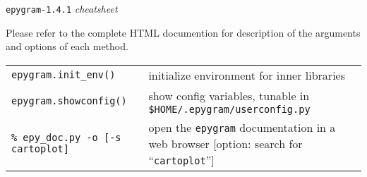 \documentclass[a4paper,10pt]{article}
\date{\vspace{-1.5cm}}
\begin{document}
\huge
\begin{center}
\texttt{epygram-1.4.1} \textit{cheatsheet}
\end{center}
\normalsize

Please refer to the complete HTML documention for description of the arguments and options of each method.\\

\begin{tabular}{|p{9.5cm}|p{9.5cm}|}
\rowcolor{gray!50}
\multicolumn{2}{|c|}{\textbf{Miscellaneous}}\\
\hline
\texttt{epygram.init\_env()} & initialize environment for inner libraries\\
\texttt{epygram.showconfig()} & show config variables, tunable in \texttt{\$HOME/.epygram/userconfig.py}\\
\texttt{\% epy\_doc.py -o [-s cartoplot]} & open the \texttt{epygram} documentation in a web browser [option: search for ``\texttt{cartoplot}'']\\
\hline
\end{tabular}\\
\\

\end{document}
